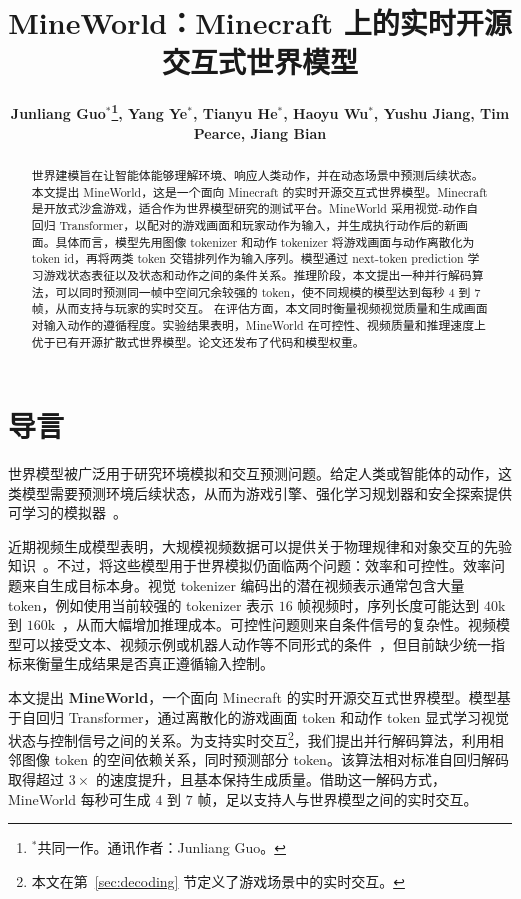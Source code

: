 \documentclass{article} %
\title{MineWorld：Minecraft 上的实时开源交互式世界模型}
\author{
\textbf{Junliang Guo$^*$\thanks{$^*$共同一作。通讯作者：Junliang Guo。}, Yang Ye$^*$, Tianyu He$^*$, Haoyu Wu$^*$, Yushu Jiang, Tim Pearce, Jiang Bian}}
\affil{
微软研究院\\ 
{\footnotesize \texttt{\{junliangguo,v-yangye,tianyuhe, v-haoywu\}@microsoft.com}}
}
\affil{
\url{https://aka.ms/mineworld}
}
\begin{document}
\maketitle

\begin{abstract}
世界建模旨在让智能体能够理解环境、响应人类动作，并在动态场景中预测后续状态。本文提出 MineWorld，这是一个面向 Minecraft 的实时开源交互式世界模型。Minecraft 是开放式沙盒游戏，适合作为世界模型研究的测试平台。MineWorld 采用视觉-动作自回归 Transformer，以配对的游戏画面和玩家动作为输入，并生成执行动作后的新画面。具体而言，模型先用图像 tokenizer 和动作 tokenizer 将游戏画面与动作离散化为 token id，再将两类 token 交错排列作为输入序列。模型通过 next-token prediction 学习游戏状态表征以及状态和动作之间的条件关系。推理阶段，本文提出一种并行解码算法，可以同时预测同一帧中空间冗余较强的 token，使不同规模的模型达到每秒 $4$ 到 $7$ 帧，从而支持与玩家的实时交互。
在评估方面，本文同时衡量视频视觉质量和生成画面对输入动作的遵循程度。实验结果表明，MineWorld 在可控性、视频质量和推理速度上优于已有开源扩散式世界模型。论文还发布了代码和模型权重。
\end{abstract}

\section{导言}
\label{sec:intro}

世界模型被广泛用于研究环境模拟和交互预测问题。给定人类或智能体的动作，这类模型需要预测环境后续状态，从而为游戏引擎、强化学习规划器和安全探索提供可学习的模拟器~\citep{ha2018world,yang2023learning,valevski2024diffusion,bruce2024genie,oasis2024,kanervisto2025world,hafner2019dream,wu2024ivideogpt,agarwal2025cosmos}。

近期视频生成模型表明，大规模视频数据可以提供关于物理规律和对象交互的先验知识~\citep{videoworldsimulators2024,parkerholder2024genie2,kanervisto2025world}。不过，将这些模型用于世界模拟仍面临两个问题：效率和可控性。效率问题来自生成目标本身。视觉 tokenizer 编码出的潜在视频表示通常包含大量 token，例如使用当前较强的 tokenizer 表示 $16$ 帧视频时，序列长度可能达到 $40$k 到 $160$k~\citep{yang2024cogvideox,tang2024vidtok,wang2024vidtwin}，从而大幅增加推理成本。可控性问题则来自条件信号的复杂性。视频模型可以接受文本、视频示例或机器人动作等不同形式的条件~\citep{videoworldsimulators2024,zhang2025autoregressive,wu2024ivideogpt}，但目前缺少统一指标来衡量生成结果是否真正遵循输入控制。

本文提出 \textbf{MineWorld}，一个面向 Minecraft 的实时开源交互式世界模型。模型基于自回归 Transformer，通过离散化的游戏画面 token 和动作 token 显式学习视觉状态与控制信号之间的关系。为支持实时交互\footnote{本文在第~\ref{sec:decoding} 节定义了游戏场景中的实时交互。}，我们提出并行解码算法，利用相邻图像 token 的空间依赖关系，同时预测部分 token。该算法相对标准自回归解码取得超过 $3\times$ 的速度提升，且基本保持生成质量。借助这一解码方式，MineWorld 每秒可生成 $4$ 到 $7$ 帧，足以支持人与世界模型之间的实时交互。
\end{document}
